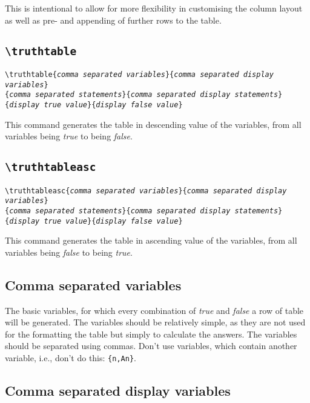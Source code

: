 \documentclass[a4paper]{article}
\begin{document}
This is intentional to allow for more flexibility in customising the column layout as well as pre- and appending of further rows to the table.

\subsection{\texttt{\textbackslash truthtable}}
\noindent\texttt{\textbackslash truthtable\{\emph{comma separated variables}\}\{\emph{comma separated display variables}\}\\\{\emph{comma separated statements}\}\{\emph{comma separated display statements}\}\\\{\emph{display true value}\}\{\emph{display false value}\}}\bigskip

This command generates the table in descending value of the variables, from all variables being \emph{true} to being \emph{false}.

\subsection{\texttt{\textbackslash truthtableasc}}

\noindent\texttt{\textbackslash truthtableasc\{\emph{comma separated variables}\}\{\emph{comma separated display variables}\}\\\{\emph{comma separated statements}\}\{\emph{comma separated display statements}\}\\\{\emph{display true value}\}\{\emph{display false value}\}}
\bigskip

This command generates the table in ascending value of the variables, from all variables being \emph{false} to being \emph{true}.

\subsection{Comma separated variables}

The basic variables, for which every combination of \emph{true} and \emph{false} a row of table will be generated. The variables should be relatively simple, as they are not used for the formatting the table but simply to calculate the answers. The variables should be separated using commas. Don't use variables, which contain another variable, i.e., don't do this: \texttt{\{n,An\}}.

\subsection{Comma separated display variables}
\end{document}
